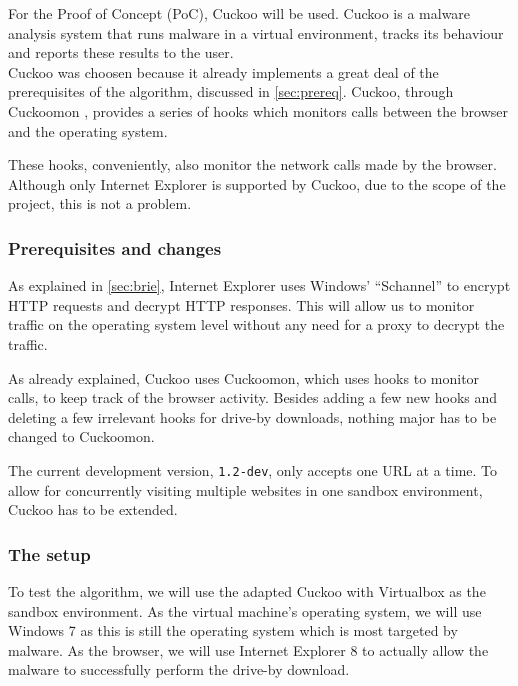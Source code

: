 
For the Proof of Concept (PoC), Cuckoo \cite{cuckoo} will be used. Cuckoo is a malware analysis system that runs malware in a virtual environment, tracks its behaviour and reports these results to the user.\\

Cuckoo was choosen because it already implements a great deal of the prerequisites of the algorithm, discussed in \ref{sec:prereq}. Cuckoo, through Cuckoomon \cite{cuckoomon}, provides a series of hooks which monitors calls between the browser and the operating system.

These hooks, conveniently, also monitor the network calls made by the browser. Although only Internet Explorer is supported by Cuckoo, due to the scope of the project, this is not a problem.

\subsubsection{Prerequisites and changes}

As explained in \ref{sec:brie}, Internet Explorer uses Windows' ``Schannel'' \cite{schannel} to encrypt HTTP requests and decrypt HTTP responses. This will allow us to monitor traffic on the operating system level without any need for a proxy to decrypt the traffic.

As already explained, Cuckoo uses Cuckoomon, which uses hooks to monitor calls, to keep track of the browser activity. Besides adding a few new hooks and deleting a few irrelevant hooks for drive-by downloads, nothing major has to be changed to Cuckoomon.

The current development version, \texttt{1.2-dev},  only accepts one URL at a time. To allow for concurrently visiting multiple websites in one sandbox environment, Cuckoo has to be extended.

\subsubsection{The setup}
\label{sec:setup}

To test the algorithm, we will use the adapted Cuckoo with Virtualbox as the sandbox environment. As the virtual machine's operating system, we will use Windows 7 as this is still the operating system which is most targeted by malware. As the browser, we will use Internet Explorer 8 to actually allow the malware to successfully perform the drive-by download.

